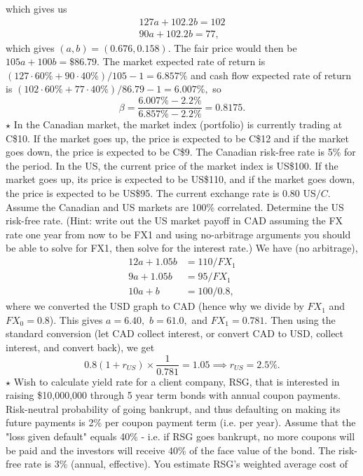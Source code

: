\documentclass[11pt,landscape]{article}
\begin{document}
\begin{multicols*}{3}
\begin{center}
\end{center}
which gives us 
\begin{align*}
    127a + 102.2b = 102 \\ 
    90a +  102.2b = 77,
\end{align*}
which gives $(a,b)=(0.676,0.158).$ The fair price would then be $105a+100b=\$86.79.$ The market expected rate of return is $(127 \cdot 60\% + 90 \cdot 40\%)/105 - 1 = 6.857\%$ and cash flow expected rate of return is $(102\cdot 60\% + 77 \cdot 40\%)/86.79 - 1 = 6.007\%,$ so $$\beta = \frac{6.007\% - 2.2\%}{6.857\% - 2.2\%} = 0.8175.$$ 
$\star$ In the Canadian market, the market index (portfolio) is currently trading at C\$10. If the market goes up, the price is expected to be C\$12 and if the market goes down, the price is expected to be C\$9. The Canadian risk-free rate is 5\% for the period. In the US, the current price of the market index is US\$100. If the market goes up, its price is expected to be US\$110, and if the market goes down, the price is expected to be US\$95. The current exchange rate is 0.80 US$/C$. Assume the Canadian and US markets are 100\% correlated. Determine the US risk-free rate. (Hint: write out the US market payoff in CAD assuming the FX rate one year from now to be FX1 and using no-arbitrage arguments you should be able to solve for FX1, then solve for the interest rate.) We have (no arbitrage),
\begin{align*}
    12a + 1.05b &= 110/FX_1 \\
    9a + 1.05b &= 95/FX_1 \\ 
    10a + b &= 100/0.8, 
\end{align*}
where we converted the USD graph to CAD (hence why we divide by $FX_1$ and $FX_0=0.8$). This gives $a=6.40,$ $b=61.0,$ and $FX_1=0.781.$ Then using the standard conversion (let CAD collect interest, or convert CAD to USD, collect interest, and convert back), we get 
\begin{equation*}
    0.8(1+r_{US}) \times \frac{1}{0.781} = 1.05 \implies r_{US} = 2.5\%.
\end{equation*}
$\star$ Wish to calculate yield rate for a client company, RSG, that is interested in raising
\$10,000,000 through 5 year term bonds with annual coupon payments. Risk-neutral probability of going bankrupt, and thus defaulting on making its future payments is 2\% per coupon payment term (i.e. per year). Assume that the "loss given default" equals 40\% - i.e. if RSG goes bankrupt, no more coupons will be paid and the investors will receive 40\% of the face value of the bond. The risk-free rate is 3\% (annual, effective). You estimate RSG's weighted average cost of

\end{multicols*}
\end{document}
